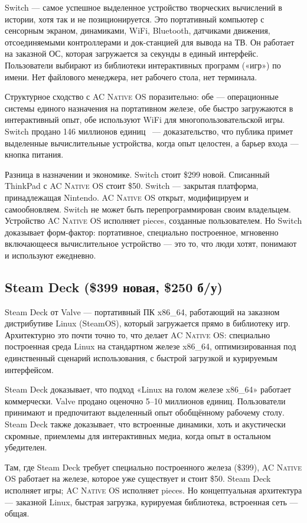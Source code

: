 \documentclass[10pt,letterpaper,twocolumn]{article}
\newcommand{\acos}{\textsc{AC Native OS}}
\begin{document}
Switch --- самое успешное выделенное устройство творческих вычислений в истории, хотя так и не позиционируется. Это портативный компьютер с сенсорным экраном, динамиками, WiFi, Bluetooth, датчиками движения, отсоединяемыми контроллерами и док-станцией для вывода на ТВ. Он работает на заказной ОС, которая загружается за секунды в единый интерфейс. Пользователи выбирают из библиотеки интерактивных программ («игр») по имени. Нет файлового менеджера, нет рабочего стола, нет терминала.

Структурное сходство с \acos{} поразительно: обе --- операционные системы единого назначения на портативном железе, обе быстро загружаются в интерактивный опыт, обе используют WiFi для многопользовательской игры. Switch продано 146 миллионов единиц~\citep{nintendo2024earnings} --- доказательство, что публика примет выделенные вычислительные устройства, когда опыт целостен, а барьер входа --- кнопка питания.

Разница в назначении и экономике. Switch стоит \$299 новой. Списанный ThinkPad с \acos{} стоит \$50. Switch --- закрытая платформа, принадлежащая Nintendo. \acos{} открыт, модифицируем и самообновляем. Switch не может быть перепрограммирован своим владельцем. Устройство \acos{} исполняет pieces, созданные пользователем. Но Switch доказывает форм-фактор: портативное, специально построенное, мгновенно включающееся вычислительное устройство --- это то, что люди хотят, понимают и используют ежедневно.

\subsection{Steam Deck (\$399 новая, \$250 б/у)}

Steam Deck от Valve --- портативный ПК x86\_64, работающий на заказном дистрибутиве Linux (SteamOS), который загружается прямо в библиотеку игр. Архитектурно это почти точно то, что делает \acos{}: специально построенная среда Linux на стандартном железе x86\_64, оптимизированная под единственный сценарий использования, с быстрой загрузкой и курируемым интерфейсом.

Steam Deck доказывает, что подход «Linux на голом железе x86\_64» работает коммерчески. Valve продано оценочно 5--10 миллионов единиц. Пользователи принимают и предпочитают выделенный опыт обобщённому рабочему столу. Steam Deck также доказывает, что встроенные динамики, хоть и акустически скромные, приемлемы для интерактивных медиа, когда опыт в остальном убедителен.

Там, где Steam Deck требует специально построенного железа (\$399), \acos{} работает на железе, которое уже существует и стоит \$50. Steam Deck исполняет игры; \acos{} исполняет pieces. Но концептуальная архитектура --- заказной Linux, быстрая загрузка, курируемая библиотека, встроенная сеть --- общая.
\end{document}
